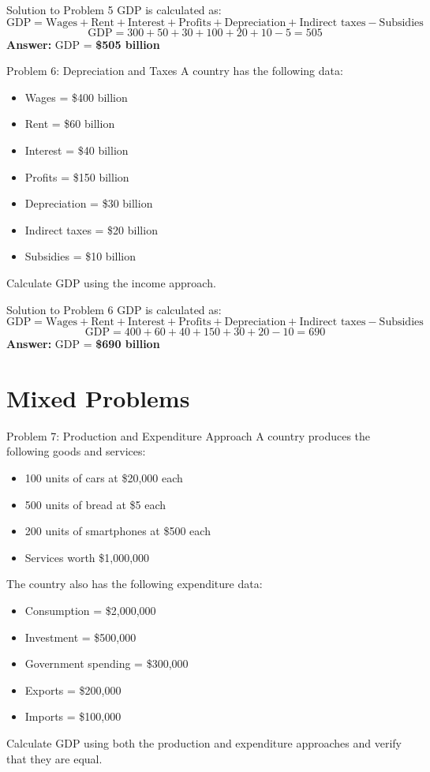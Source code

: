 \documentclass{beamer}
\begin{document}
\begin{frame}{Solution to Problem 5}
GDP is calculated as:
\[
\text{GDP} = \text{Wages} + \text{Rent} + \text{Interest} + \text{Profits} + \text{Depreciation} + \text{Indirect taxes} - \text{Subsidies}
\]
\[
\text{GDP} = 300 + 50 + 30 + 100 + 20 + 10 - 5 = 505
\]
\textbf{Answer:} GDP = \textbf{\$505 billion}
\end{frame}

\begin{frame}{Problem 6: Depreciation and Taxes}
A country has the following data:
\begin{itemize}
    \item Wages = \$400 billion
    \item Rent = \$60 billion
    \item Interest = \$40 billion
    \item Profits = \$150 billion
    \item Depreciation = \$30 billion
    \item Indirect taxes = \$20 billion
    \item Subsidies = \$10 billion
\end{itemize}
Calculate GDP using the income approach.
\end{frame}

\begin{frame}{Solution to Problem 6}
GDP is calculated as:
\[
\text{GDP} = \text{Wages} + \text{Rent} + \text{Interest} + \text{Profits} + \text{Depreciation} + \text{Indirect taxes} - \text{Subsidies}
\]
\[
\text{GDP} = 400 + 60 + 40 + 150 + 30 + 20 - 10 = 690
\]
\textbf{Answer:} GDP = \textbf{\$690 billion}
\end{frame}

\section{Mixed Problems}

\begin{frame}{Problem 7: Production and Expenditure Approach}
A country produces the following goods and services:
\begin{itemize}
    \item 100 units of cars at \$20,000 each
    \item 500 units of bread at \$5 each
    \item 200 units of smartphones at \$500 each
    \item Services worth \$1,000,000
\end{itemize}
The country also has the following expenditure data:
\begin{itemize}
    \item Consumption = \$2,000,000
    \item Investment = \$500,000
    \item Government spending = \$300,000
    \item Exports = \$200,000
    \item Imports = \$100,000
\end{itemize}
Calculate GDP using both the production and expenditure approaches and verify that they are equal.
\end{frame}
\end{document}
